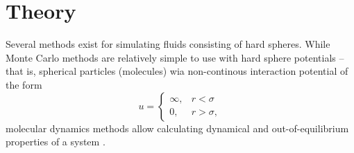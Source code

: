 \section{Theory}
\label{sec:theory}
Several methods exist for simulating fluids consisting of hard spheres.
While Monte Carlo methods are relatively simple to use with hard sphere potentials -- that is, spherical particles (molecules) wia non-continous interaction potential of the form
\begin{equation}
    u = 
    \begin{cases}
        \infty, & r < \sigma \\
        0, & r > \sigma,
    \end{cases}
\end{equation}
molecular dynamics methods allow calculating dynamical and out-of-equilibrium properties of a system \cite{ALLEN:MD_sim}.

